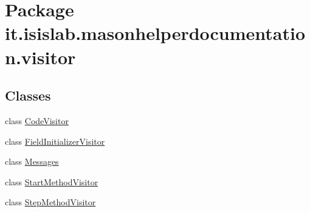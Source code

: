 \hypertarget{namespaceit_1_1isislab_1_1masonhelperdocumentation_1_1visitor}{\section{Package it.\-isislab.\-masonhelperdocumentation.\-visitor}
\label{namespaceit_1_1isislab_1_1masonhelperdocumentation_1_1visitor}
}
\subsection*{Classes}
\begin{DoxyCompactItemize}
\item 
class \hyperlink{classit_1_1isislab_1_1masonhelperdocumentation_1_1visitor_1_1_code_visitor}{Code\-Visitor}
\item 
class \hyperlink{classit_1_1isislab_1_1masonhelperdocumentation_1_1visitor_1_1_field_initializer_visitor}{Field\-Initializer\-Visitor}
\item 
class \hyperlink{classit_1_1isislab_1_1masonhelperdocumentation_1_1visitor_1_1_messages}{Messages}
\item 
class \hyperlink{classit_1_1isislab_1_1masonhelperdocumentation_1_1visitor_1_1_start_method_visitor}{Start\-Method\-Visitor}
\item 
class \hyperlink{classit_1_1isislab_1_1masonhelperdocumentation_1_1visitor_1_1_step_method_visitor}{Step\-Method\-Visitor}
\end{DoxyCompactItemize}
